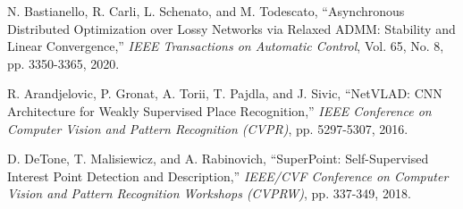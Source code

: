 \documentclass[a4paper,fleqn,10pt,twocolumn]{SICE_ISCS}
\begin{document}
\begin{thebibliography}{99}
 N. Bastianello, R. Carli, L. Schenato, and M. Todescato, ``Asynchronous Distributed Optimization over Lossy Networks via Relaxed ADMM: Stability and Linear Convergence,'' {\it IEEE Transactions on Automatic Control}, Vol. 65, No. 8, pp. 3350-3365, 2020.

 R. Arandjelovic, P. Gronat, A. Torii, T. Pajdla, and J. Sivic, ``NetVLAD: CNN Architecture for Weakly Supervised Place Recognition,'' {\it IEEE Conference on Computer Vision and Pattern Recognition (CVPR)}, pp. 5297-5307, 2016.

 D. DeTone, T. Malisiewicz, and A. Rabinovich, ``SuperPoint: Self-Supervised Interest Point Detection and Description,'' {\it IEEE/CVF Conference on Computer Vision and Pattern Recognition Workshops (CVPRW)}, pp. 337-349, 2018.

\end{thebibliography}
\end{document}
